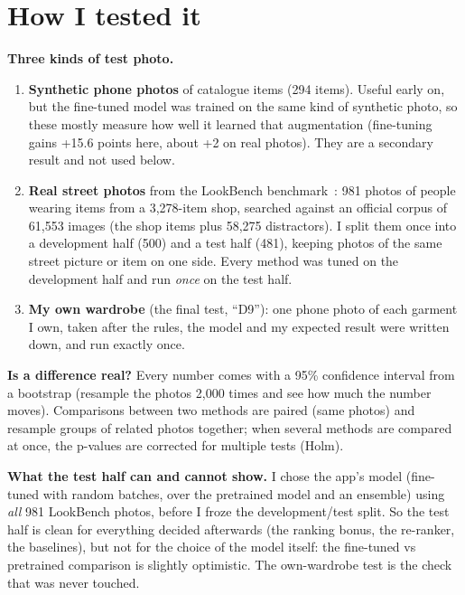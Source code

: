 \documentclass[11pt,a4paper]{article}
\begin{document}
\section{How I tested it}

\textbf{Three kinds of test photo.}
\begin{enumerate}
\item \textbf{Synthetic phone photos} of catalogue items (294 items). Useful early on, but the fine-tuned
  model was trained on the same kind of synthetic photo, so these mostly measure how well it learned that
  augmentation (fine-tuning gains +15.6 points here, about +2 on real photos). They are a secondary result
  and not used below.
\item \textbf{Real street photos} from the LookBench benchmark~\cite{lookbench}: 981 photos of people wearing items from a
  3,278-item shop, searched against an official corpus of 61,553 images (the shop items plus 58,275
  distractors). I split them once into a development half (500) and a test half (481), keeping photos of
  the same street picture or item on one side. Every method was tuned on the development half and run
  \emph{once} on the test half.
\item \textbf{My own wardrobe} (the final test, ``D9''): one phone photo of each garment I own, taken after
  the rules, the model and my expected result were written down, and run exactly once.
\end{enumerate}

\textbf{Is a difference real?} Every number comes with a 95\% confidence interval from a bootstrap (resample
the photos 2,000 times and see how much the number moves). Comparisons between two methods are paired (same
photos) and resample groups of related photos together; when several methods are compared at once, the
p-values are corrected for multiple tests (Holm).

\textbf{What the test half can and cannot show.} I chose the app's model (fine-tuned with random batches, over the pretrained model and an ensemble) using
\emph{all} 981 LookBench photos, before I froze the development/test split. So the test half is clean for
everything decided afterwards (the ranking bonus, the re-ranker, the baselines), but not for the choice of
the model itself: the fine-tuned vs pretrained comparison is slightly optimistic. The own-wardrobe test is
the check that was never touched.

\end{document}
